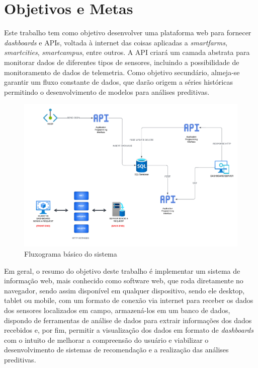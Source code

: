 \documentclass[tcc-proposta]{texufpel}
\begin{document}
\chapter{Objetivos e Metas}
Este trabalho tem como objetivo desenvolver uma plataforma web para fornecer \textit{dashboards} e APIs, voltada à internet das coisas aplicadas a \textit{smartfarms}, \textit{smartcities}, \textit{smartcampus}, entre outros. A API criará um camada abstrata para monitorar dados de diferentes tipos de sensores, incluindo a possibilidade de monitoramento de dados de telemetria. Como objetivo secundário, almeja-se garantir um fluxo constante de dados, que darão origem a séries históricas permitindo o desenvolvimento de modelos para análises preditivas. 
\\

\begin{figure}[!htb]
    \centering
    \includegraphics[scale=0.6]{tcc_flowchart.png}
    \caption{Fluxograma básico do sistema}
    \label{fig:my_label}
\end{figure}

Em geral, o resumo do objetivo deste trabalho é implementar um sistema de informação web, mais conhecido como software web, que roda diretamente no navegador, sendo assim disponível em qualquer dispositivo, sendo ele desktop, tablet ou mobile, com um formato de conexão via internet para receber os dados dos sensores localizados em campo, armazená-los em um banco de dados, dispondo de ferramentas de análise de dados para extrair informações dos dados recebidos e, por fim, permitir a visualização dos dados em formato de \textit{dashboards} com o intuito de melhorar a compreensão do usuário e viabilizar o desenvolvimento de sistemas de recomendação e a realização das análises preditivas.
\\
\end{document}
